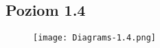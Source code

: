 \documentclass{article}
\begin{document}
\subsection{Poziom 1.4}
\begin{figure}[!htb]
\centering
\texttt{[image: Diagrams-1.4.png]}
\caption{}
\end{figure}
\FloatBarrier


\end{document}

